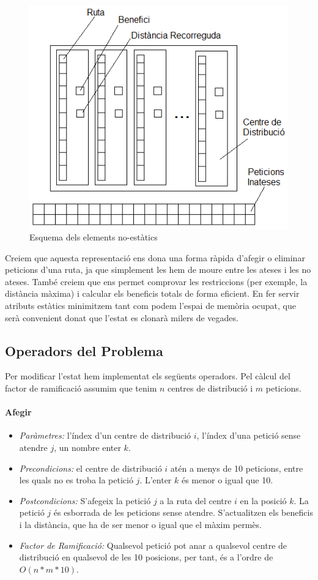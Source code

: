 \documentclass[a4paper]{article}
\begin{document}
\begin{figure}[h]
\centering
\includegraphics[scale=0.65]{images/fig2.png}
\caption{Esquema dels elements no-estàtics}
\end{figure}

Creiem que aquesta representació ens dona una forma ràpida d'afegir o eliminar peticions d'una ruta, ja que simplement les hem de moure entre les ateses i les no ateses. També creiem que ens permet comprovar les restriccions (per exemple, la distància màxima) i calcular els beneficis totals de forma eficient. En fer servir atributs estàtics minimitzem tant com podem l'espai de memòria ocupat, que serà convenient donat que l'estat es clonarà milers de vegades.\\

\newpage
\subsection{Operadors del Problema}
Per modificar l'estat hem implementat els següents operadors. Pel càlcul del factor de ramificació assumim que tenim $n$ centres de distribució i $m$ peticions.

\paragraph{Afegir}
\begin{itemize}
\item \emph{Paràmetres:} l'índex d'un centre de distribució $i$, l'índex d'una petició sense atendre $j$, un nombre enter $k$.
\item \emph{Precondicions:} el centre de distribució $i$ atén a menys de 10 peticions, entre les quals no es troba la petició $j$. L'enter $k$ és menor o igual que 10.
\item \emph{Postcondicions:} S'afegeix la petició $j$ a la ruta del centre $i$ en la posició $k$. La petició $j$ és esborrada de les peticions sense atendre. S'actualitzen els beneficis i la distància, que ha de ser menor o igual que el màxim permès.
\item \emph{Factor de Ramificació:} Qualsevol petició pot anar a qualsevol centre de distribució en qualsevol de les 10 posicions, per tant, és a l'ordre de $O(n*m*10)$.
\end{itemize}
\end{document}
